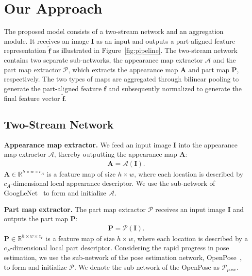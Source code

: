 \documentclass{llncs}
\begin{document}
\section{Our Approach}
The proposed model consists of a two-stream network and an aggregation module. It receives an image $\mathbf{I}$ as an input and outputs a part-aligned feature representation $\tilde{\mathbf{f}}$ as illustrated in Figure~\ref{fig:pipeline}. The two-stream network contains two separate sub-networks, the appearance map extractor $\mathcal{A}$ and the part map extractor $\mathcal{P}$, which extracts the appearance map $\mathbf{A}$ and part map \textbf{P}, respectively. The two types of maps are aggregated through bilinear pooling to generate the part-aligned feature $\mathbf{f}$ and subsequently normalized to generate the final feature vector $\tilde{\mathbf{f}}$.

\subsection{Two-Stream Network}
\noindent\textbf{Appearance map extractor.}
We feed an input image $\mathbf{I}$ into the
appearance map extractor $\mathcal{A}$, thereby
outputting the appearance map
$\mathbf{A}$:
\begin{align}
\mathbf{A} = \mathcal{A}(\mathbf{I}).
\label{eq:appearance_map}
\end{align}
$\mathbf{A} \in \mathbb{R}^{h \times w \times c_A}$ is a feature map of size $h \times w$, where each location is described by $c_A$-dimensional local appearance descriptor. We use the sub-network of GoogLeNet~\cite{inceptionv1} to form and initialize $\mathcal{A}$.

\noindent\textbf{Part map extractor.}
The part map extractor $\mathcal{P}$ receives an input image $\mathbf{I}$ and outputs the part map $\mathbf{P}$:
\begin{align}
\mathbf{P}=\mathcal{P}(\mathbf{I}).
\end{align}
$\mathbf{P}\in \mathbb{R}^{h\times w \times c_P}$ is a feature map of size $h \times w$, where each location is described by a $c_P$-dimensional local part descriptor. 
Considering the rapid progress in pose estimation, we use the sub-network of the pose estimation network, OpenPose~\cite{conf/cvpr/cao17}, to form and initialize $\mathcal{P}$. We denote the sub-network of the OpenPose as $\mathcal{P}_{pose}$.
\end{document}
